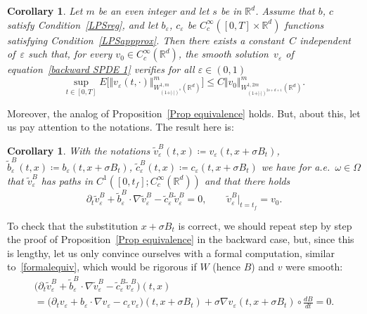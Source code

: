 \documentclass[a4paper,10pt]{article}
\newtheorem{corollary}[theorem]{Corollary}
\newcommand\1{\mathbbm{1}}
\newcommand{\mr}{\mathbb{R}}
\newcommand{\eps}{\varepsilon}
\numberwithin{equation}{section}
\begin{document}
\begin{corollary}
\label{corollary regularity backward} Let $m$ be an even integer and let $s$ be in $\mathbb{R}^d$. Assume that $b$, $c$ satisfy Condition~\ref{LPSreg}, and let $b_{\eps}$, $c_{\eps}$ be $C_{c}^{\infty}([0,T]\times\mr^d)$ functions satisfying Condition~\ref{LPSappprox}. Then there exists a constant~$C$ independent of~$\eps$ such that, for every  $v_{0}\in C_{c}^{\infty}(\mr^d)$, the smooth solution~$v_{\eps}$ of equation~\eqref{backward SPDE 1} verifies for all $\eps\in (0,1)$
\begin{equation*}
\sup_{t\in [0,T]} E\Big[ \Vert v_{\eps}(t,\cdot)\Vert_{W_{(1+ \vert \cdot \vert)^{s}}^{1,m}(\mathbb{R}^{d})}^{m}\Big]  \leq C \Vert v_{0}\Vert _{W_{(  1+ \vert \cdot \vert )
^{2s+d+1}}^{1,2m}(\mathbb{R}^{d})}^{m}.
\end{equation*}
\end{corollary}

Moreover, the analog of Proposition~\ref{Prop equivalence} holds. But, about this, let us pay attention to the notations. The result here is:

\begin{corollary}

With the notations $\widetilde{v}_{\eps}^{B}(t,x) \coloneqq v_{\eps}(t,x+\sigma B_{t})$, $\widetilde{b}_{\eps}^{B}(t,x) \coloneqq b_{\eps}(t,x+\sigma B_{t})$, $\widetilde{c}_{\eps}^{B}(t,x) \coloneqq c_{\eps}(t,x+\sigma B_{t})$ we have for a.e.~$\omega\in\Omega$ that $\widetilde{v}_{\eps}^{B}$ has paths in $C^{1}([0,t_{f}];C_{c}^{\infty}(\mathbb{R}^{d}))$ and that there holds
\begin{equation}
\partial_t \widetilde{v}_{\eps}^{B}+\widetilde{b}_{\eps}^{B}\cdot\nabla\widetilde{v}_{\eps}^{B}-\widetilde{c}_{\eps}^{B}\widetilde{v}_{\eps}^{B}=0,\qquad\widetilde{v}_{\eps}^{B}|_{t=t_{f}}=v_{0} . \label{pre-dual equation}
\end{equation}
\end{corollary}

To check that the substitution $x+\sigma B_{t}$ is correct, we should repeat step by step the proof of Proposition~\ref{Prop equivalence} in the backward case, but, since this is lengthy, let us only convince ourselves with a formal computation, similar to~\eqref{formalequiv}, which would be rigorous if $W$ (hence $B$) and $v$ were smooth:
\begin{multline*}
\Big( \partial_t \widetilde{v}_{\eps}^{B} +\widetilde{b}_{\eps}^{B}\cdot\nabla\widetilde{v}_{\eps}^{B}-\widetilde{c}_{\eps}^{B}\widetilde{v}_{\eps}^{B}\Big) (t,x) \\
  = \Big( \partial_t v_{\eps} +b_{\eps}\cdot\nabla v_{\eps}-c_{\eps}v_{\eps}\Big) (t,x+\sigma B_{t}) +\sigma\nabla v_{\eps}(t,x+\sigma B_{t}) \circ \frac{dB}{dt}=0 .
\end{multline*}
\end{document}
